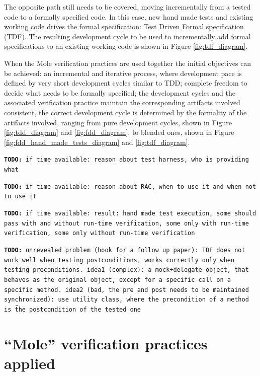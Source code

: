 \documentclass[english]{lni}
\newcommand{\todo}[1]{\texttt{\textbf{TODO:} #1}}
\begin{document}
The opposite path still needs to be covered, moving incrementally from a tested code to a formally specified code.
In this case, new hand made tests and existing working code drives the formal specification: Test Driven Formal specification (TDF).
The resulting development cycle to be used to incrementally add formal specifications to an existing working code is shown in Figure \ref{fig:tdf_diagram}.

When the Mole verification practices are used together the initial objectives can be achieved: an incremental and iterative process, where development pace is defined by very short development cycles similar to TDD; complete freedom to decide what needs to be formally specified; the development cycles and the associated verification practice maintain the corresponding artifacts involved consistent, the correct development cycle is determined by the formality of the artifacts involved, ranging from pure development cycles, shown in Figure \ref{fig:tdd_diagram} and \ref{fig:fdd_diagram}, to blended ones, shown in Figure \ref{fig:fdd_hand_made_tests_diagram} and \ref{fig:tdf_diagram}.

\todo{if time available: reason about test harness, who is providing what}

\todo{if time available: reason about RAC, when to use it and when not to use it}

\todo{if time available: result: hand made test execution, some should pass with and without run-time verification, some only with run-time verification, some only without run-time verification}

\todo{unrevealed problem (hook for a follow up paper): TDF does not work well when testing postconditions, works correctly only when testing preconditions. idea1 (complex): a mock+delegate object, that behaves as the original object, except for a specific call on a specific method. idea2 (bad, the pre and post needs to be maintained synchronized): use utility class, where the precondition of a method is \~ the postcondition of the tested one}



\section{``Mole'' verification practices applied}
\label{sec:a_complex_case_study}
\end{document}

